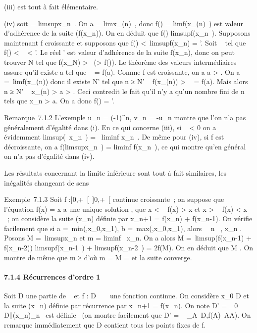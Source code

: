 \documentclass[]{article}
\begin{document}
(iii) est tout à fait élémentaire.

(iv) soit \ell = limsupx_n~. On a \ell
= limx_\phi(n)~, donc f(\ell)
= limf(x_\phi(n)~) est valeur d'adhérence
de la suite (f(x_n)). On en déduit que f(\ell)
\leq limsupf(x_n~). Supposons maintenant
f croissante et supposons que f(\ell) <\
limsupf(x_n) = \ell'. Soit \alpha~ tel que f(\ell) < \alpha~
< \ell'. Le réel \ell' est valeur d'adhérence de la suite
f(x_n), donc on peut trouver N tel que f(x_N)
> \alpha~(> f(\ell)). Le théorème des valeurs
intermédiaires assure qu'il existe a tel que \alpha~ = f(a). Comme f est
croissante, on a a > \ell. On a \ell =\
limf(x_\phi(n)) donc il existe N' tel que n ≥ N' \rigtharrow~
f(x_\phi(n)) > \alpha~ = f(a). Mais alors n ≥ N' \rigtharrow~
x_\phi(n) > a > \ell. Ceci contredit le
fait qu'il n'y a qu'un nombre fini de n tels que x_n
> a. On a donc f(\ell) = \ell'.

Remarque~7.1.2 L'exemple u_n = (-1)^n, v_n
= -u_n montre que l'on n'a pas généralement d'égalité dans (i).
En ce qui concerne (iii), si \lambda~ < 0 on a évidemment
limsup(\lambda~x_n~) =
\lambda~liminf x_n~. De même pour (iv), si f
est décroissante, on a f(limsupx_n~)
= liminf f(x_n~), ce qui montre qu'en
général on n'a pas d'égalité dans (iv).

Les résultats concernant la limite inférieure sont tout à fait
similaires, les inégalités changeant de sens

Exemple~7.1.3 Soit f :]0,+\infty~[\rightarrow~]0,+\infty~[ continue croissante~; on
suppose que l'équation f(x) = x  a une unique
solution \ell, que x < \ell \rigtharrow~ f(x) > x
\over 2 et x > \ell \rigtharrow~ f(x) < x
\over 2 ~; on considère la suite (x_n) définie
par x_n+1 = f(x_n) + f(x_n-1). On vérifie
facilement que si a =\
min(\ell,x_0,x_1), b =\
max(\ell,x_0,x_1), alors \forall~~n \in
\mathbb{N}~, x_n \in [a,b]. Posons M =\
limsupx_n et m = liminf~
x_n. On a alors M =\
limsup(f(x_n-1) + f(x_n-2))
\leq limsupf(x_n-1~)
+ limsupf(x_n-2~) = 2f(M). On en
déduit que M \leq \ell. On montre de même que m ≥ \ell d'où m = M = \ell et la suite
converge.

\paragraph{7.1.4 Récurrences d'ordre 1}

Soit D une partie de \mathbb{R}~ et f : D \rightarrow~ ~ une fonction continue. On considère
x_0 \in D et la suite (x_n) définie par récurrence par
x_n+1 = f(x_n). On note D' =
\x_0 \in
D∣(x_n)_n\in\mathbb{N}~\text
est définie \ (on montre facilement que D'
= \⋃ ~
_A\subset~D,f(A)\subset~AA). On remarque immédiatement que D contient tous les
points fixes de f.
\end{document}
